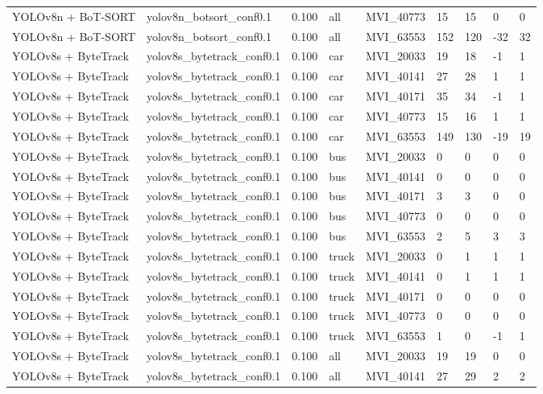 \begin{tabular}{lllllllll}
YOLOv8n + BoT-SORT & yolov8n\_botsort\_conf0.1 & 0.100 & all & MVI\_40773 & 15 & 15 & 0 & 0 \\
YOLOv8n + BoT-SORT & yolov8n\_botsort\_conf0.1 & 0.100 & all & MVI\_63553 & 152 & 120 & -32 & 32 \\
YOLOv8s + ByteTrack & yolov8s\_bytetrack\_conf0.1 & 0.100 & car & MVI\_20033 & 19 & 18 & -1 & 1 \\
YOLOv8s + ByteTrack & yolov8s\_bytetrack\_conf0.1 & 0.100 & car & MVI\_40141 & 27 & 28 & 1 & 1 \\
YOLOv8s + ByteTrack & yolov8s\_bytetrack\_conf0.1 & 0.100 & car & MVI\_40171 & 35 & 34 & -1 & 1 \\
YOLOv8s + ByteTrack & yolov8s\_bytetrack\_conf0.1 & 0.100 & car & MVI\_40773 & 15 & 16 & 1 & 1 \\
YOLOv8s + ByteTrack & yolov8s\_bytetrack\_conf0.1 & 0.100 & car & MVI\_63553 & 149 & 130 & -19 & 19 \\
YOLOv8s + ByteTrack & yolov8s\_bytetrack\_conf0.1 & 0.100 & bus & MVI\_20033 & 0 & 0 & 0 & 0 \\
YOLOv8s + ByteTrack & yolov8s\_bytetrack\_conf0.1 & 0.100 & bus & MVI\_40141 & 0 & 0 & 0 & 0 \\
YOLOv8s + ByteTrack & yolov8s\_bytetrack\_conf0.1 & 0.100 & bus & MVI\_40171 & 3 & 3 & 0 & 0 \\
YOLOv8s + ByteTrack & yolov8s\_bytetrack\_conf0.1 & 0.100 & bus & MVI\_40773 & 0 & 0 & 0 & 0 \\
YOLOv8s + ByteTrack & yolov8s\_bytetrack\_conf0.1 & 0.100 & bus & MVI\_63553 & 2 & 5 & 3 & 3 \\
YOLOv8s + ByteTrack & yolov8s\_bytetrack\_conf0.1 & 0.100 & truck & MVI\_20033 & 0 & 1 & 1 & 1 \\
YOLOv8s + ByteTrack & yolov8s\_bytetrack\_conf0.1 & 0.100 & truck & MVI\_40141 & 0 & 1 & 1 & 1 \\
YOLOv8s + ByteTrack & yolov8s\_bytetrack\_conf0.1 & 0.100 & truck & MVI\_40171 & 0 & 0 & 0 & 0 \\
YOLOv8s + ByteTrack & yolov8s\_bytetrack\_conf0.1 & 0.100 & truck & MVI\_40773 & 0 & 0 & 0 & 0 \\
YOLOv8s + ByteTrack & yolov8s\_bytetrack\_conf0.1 & 0.100 & truck & MVI\_63553 & 1 & 0 & -1 & 1 \\
YOLOv8s + ByteTrack & yolov8s\_bytetrack\_conf0.1 & 0.100 & all & MVI\_20033 & 19 & 19 & 0 & 0 \\
YOLOv8s + ByteTrack & yolov8s\_bytetrack\_conf0.1 & 0.100 & all & MVI\_40141 & 27 & 29 & 2 & 2 \\

\end{tabular}
